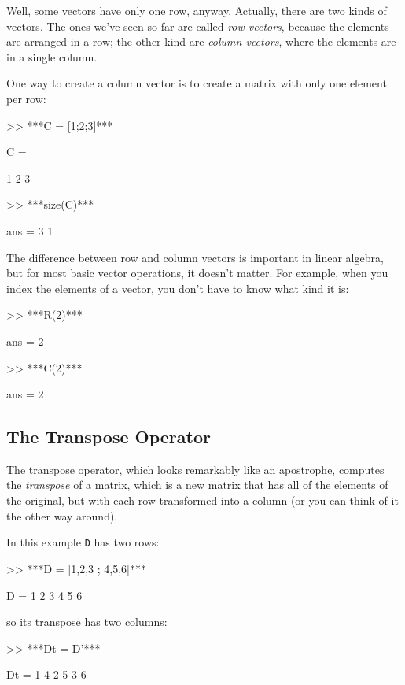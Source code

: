 Well, some vectors have only one row, anyway.  Actually, there are two kinds
of vectors.  The ones we've seen so far are called \emph{row vectors},
because the elements are arranged in a row; the other kind are
\emph{column vectors}, where the elements are in a single column.

One way to create a column vector is to create a matrix with only
one element per row:

\begin{code}
>> ***C = [1;2;3]***

C =

     1
     2
     3

>> ***size(C)***

ans = 3     1
\end{code}

The difference between row and column vectors is important in
linear algebra, but for most basic vector operations, it doesn't matter.  
For example, when you index the elements of a vector, you don't have to know what kind
it is:


\begin{code}
>> ***R(2)***

ans = 2

>> ***C(2)***

ans = 2
\end{code}


\subsection{The Transpose Operator}

The transpose operator, which looks remarkably like an apostrophe,
computes the \emph{transpose} of a matrix, which is a new matrix
that has all of the elements of the original, but with each row
transformed into a column (or you can think of it the other way around).


In this example \lstinline{D} has two rows:

\begin{code}
>> ***D = [1,2,3 ; 4,5,6]***

D =  1     2     3
     4     5     6
\end{code}
so its transpose has two columns:

\begin{code}
>> ***Dt = D'***

Dt = 1     4
     2     5
     3     6
\end{code}

